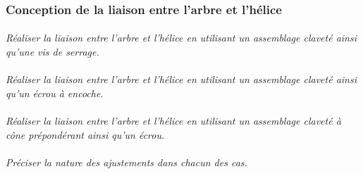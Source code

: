 \documentclass[11pt,oneside]{article}
\begin{document}
\subsubsection*{Conception de la liaison entre l'arbre et l'hélice}
\begin{minipage}[c]{.6\linewidth}
\paragraph{}
\textit{Réaliser la liaison entre l'arbre et l'hélice en utilisant un assemblage claveté ainsi qu'une vis de serrage.}

\paragraph{}
\textit{Réaliser la liaison entre l'arbre et l'hélice en utilisant un assemblage claveté ainsi qu'un écrou à encoche.}

\paragraph{}
\textit{Réaliser la liaison entre l'arbre et l'hélice en utilisant un assemblage claveté à cône prépondérant ainsi qu'un écrou.}

\paragraph{}
\textit{Préciser la nature des ajustements dans chacun des cas.}

\end{minipage}\hfill
\end{document}

